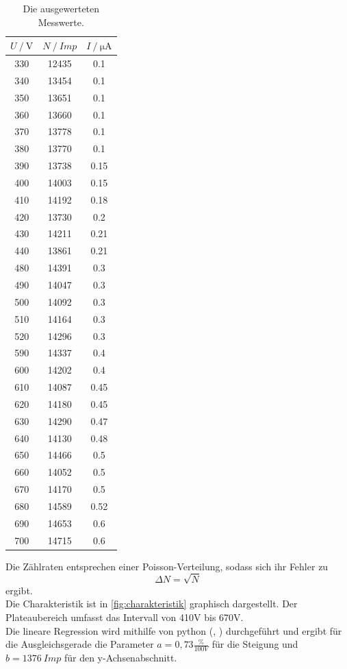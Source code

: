 \begin{table}[H]
  \centering
  \caption{Die ausgewerteten Messwerte.}
  \begin{tabular}{ccc}
    \toprule
    {$U  \mathbin{/} \unit{\volt}$} &
    {$N \mathbin{/} \mathbin{Imp}$} &
    {$I \mathbin{/} \unit{\micro\ampere}$} \\
    \midrule
    330  &  12435 &  0.1   \\
    340  &  13454 &  0.1   \\
    350  &  13651 &  0.1   \\
    360  &  13660 &  0.1   \\
    370  &  13778 &  0.1   \\
    380  &  13770 &  0.1   \\
    390  &  13738 &  0.15  \\
    400  &  14003 &  0.15  \\
    410  &  14192 &  0.18  \\
    420  &  13730 &  0.2   \\
    430  &  14211 &  0.21  \\
    440  &  13861 &  0.21  \\
    480  &  14391 &  0.3   \\
    490  &  14047 &  0.3   \\
    500  &  14092 &  0.3   \\
    510  &  14164 &  0.3   \\
    520  &  14296 &  0.3   \\
    590  &  14337 &  0.4   \\
    600  &  14202 &  0.4   \\
    610  &  14087 &  0.45  \\
    620  &  14180 &  0.45  \\
    630  &  14290 &  0.47  \\
    640  &  14130 &  0.48  \\
    650  &  14466 &  0.5   \\
    660  &  14052 &  0.5   \\
    670  &  14170 &  0.5   \\
    680  &  14589 &  0.52  \\
    690  &  14653 &  0.6   \\
    700  &  14715 &  0.6   \\
    \bottomrule
  \end{tabular}
  \label{tab:charak}
\end{table}

Die Zählraten entsprechen einer Poisson-Verteilung, sodass sich ihr Fehler zu 
\begin{equation*}
  \Delta N = \sqrt{N}
\end{equation*}
ergibt.\\
Die Charakteristik ist in \autoref{fig:charakteristik} graphisch dargestellt.
Der Plateaubereich umfasst das Intervall von 410V bis 670V.\\
Die lineare Regression wird mithilfe von python (\cite{numpy}, \cite{uncertainties}) durchgeführt und ergibt
für die Ausgleichsgerade die Parameter $a = 0,73 \frac{\%}{100 V}$ für die Steigung und $b = 1376 \: Imp$ für den y-Achsenabschnitt.\\


